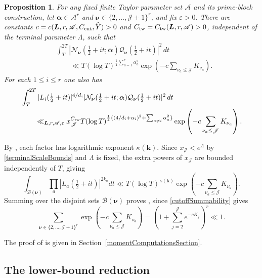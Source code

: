 \documentclass[oneside, 12pt]{amsart}
\newtheorem{prop}[thm]{Proposition}
\theoremstyle{definition}
\begin{document}
{\begin{prop}
			For any fixed finite Taylor parameter set $\mathscr A$ and its
			prime-block construction, let $\boldsymbol\alpha\in\mathscr A^r$ and
			$\boldsymbol\nu\in\{2,\ldots,\mathscr J+1\}^r$, and fix
			$\varepsilon>0$.  There are constants
			$c=c(\boldsymbol L,r,\mathscr A,C_{\rm cut},\widehat Y)>0$ and
			$C_{\rm tw}=C_{\rm tw}(\boldsymbol L,r,\mathscr A)>0$, independent of
			the terminal parameter $\Lambda$, such that
			\begin{align}
				&\int_T^{2T}
				|\mathcal N_{\boldsymbol\nu}(\tfrac12+it;\boldsymbol\alpha)
				\mathcal Q_{\boldsymbol\nu}(\tfrac12+it)|^2\,dt\nonumber\\
				&\qquad\ll T(\log T)^{\frac14\sum_{a=1}^r\alpha_a^2}
				\exp\left(-c\sum_{\nu_a\leq\mathscr J}K_{\nu_a}\right).
				\label{unifiedUntwistedMean}
			\end{align}
			For each $1\leq i\leq r$ one also has
			\begin{align}
				&\int_T^{2T}|L_i(\tfrac12+it)|^{4/d_i}
				|\mathcal N_{\boldsymbol\nu}(\tfrac12+it;\boldsymbol\alpha)
				\mathcal Q_{\boldsymbol\nu}(\tfrac12+it)|^2\,dt\nonumber\\
				&\qquad\ll_{\boldsymbol L,r,\mathscr A,\varepsilon}
				x_{\mathscr J}^{C_{\rm tw}}
				T(\log T)^{\frac14\{(4/d_i+\alpha_i)^2+
					\sum_{a\neq i}\alpha_a^2\}}
				\exp\left(-c\sum_{\nu_a\leq\mathscr J}K_{\nu_a}\right).
				\label{unifiedTwistedMean}
			\end{align}
		\end{prop}
		
		By , each factor has logarithmic
		exponent $\kappa(\boldsymbol k)$. Since $x_{\mathscr J}<e^\Lambda$ by
		\eqref{terminalScaleBounds} and $\Lambda$ is fixed, the extra powers
		of $x_{\mathscr J}$ are bounded independently of $T$, giving
		\[
		\int_{\mathscr B(\boldsymbol\nu)}
		\prod_a|L_a(\tfrac12+it)|^{2k_a}dt
		\ll T(\log T)^{\kappa(\boldsymbol k)}
		\exp\left(-c\sum_{\nu_a\leq\mathscr J}K_{\nu_a}\right).
		\]
		Summing over the disjoint sets $\mathscr B(\boldsymbol\nu)$ proves
		, since \eqref{cutoffSummability} gives
		\[
		\sum_{\boldsymbol\nu\in\{2,\ldots,\mathscr J+1\}^r}
		\exp\left(-c\sum_{\nu_a\leq\mathscr J}K_{\nu_a}\right)
		=\left(1+\sum_{j=2}^{\mathscr J}e^{-cK_j}\right)^r\ll1.
		\]
		
		The proof of  is given in
		Section~\ref{momentComputationsSection}.
		
		\subsection{The lower-bound reduction}
		
}
\end{document}
